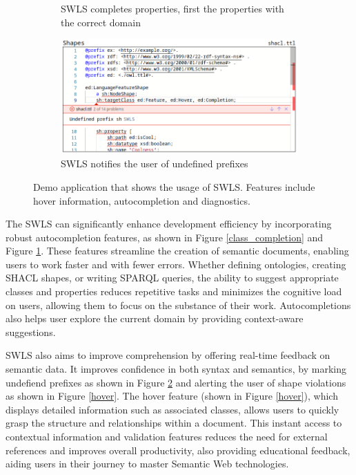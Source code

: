 \begin{figure}[tb]
\begin{subfigure}{0.48\textwidth}
      \caption{SWLS completes properties, first the properties with the correct domain}
      \label{property_completion}
    \end{subfigure}
    \hfill
    \begin{subfigure}{0.48\textwidth}
      \includegraphics[width=\textwidth]{./images/undefined.png}
      \caption{SWLS notifies the user of undefined prefixes}
      \label{undefined_prefix}
    \end{subfigure}
    \caption{
      Demo application that shows the usage of SWLS. Features include hover information, autocompletion and diagnostics.
    }\label{lst:Demo}
\end{figure}

The SWLS can significantly enhance development efficiency by incorporating robust autocompletion features, as shown in Figure \ref{class_completion} and Figure \ref{property_completion}.
These features streamline the creation of semantic documents, enabling users to work faster and with fewer errors. 
Whether defining ontologies, creating SHACL shapes, or writing SPARQL queries, the ability to suggest appropriate classes and properties reduces repetitive tasks and minimizes the cognitive load on users, allowing them to focus on the substance of their work.
Autocompletions also helps user explore the current domain by providing context-aware suggestions.

SWLS also aims to improve comprehension by offering real-time feedback on semantic data.
It improves confidence in both syntax and semantics, by marking undefiend prefixes as shown in Figure \ref{undefined_prefix}
and alerting the user of shape violations as shown in Figure \ref{hover}.
The hover feature (shown in Figure \ref{hover}), which displays detailed information such as associated classes,
allows users to quickly grasp the structure and relationships within a document. 
This instant access to contextual information and validation features reduces the need for external references and improves overall productivity,
also providing educational feedback, aiding users in their journey to master Semantic Web technologies.

